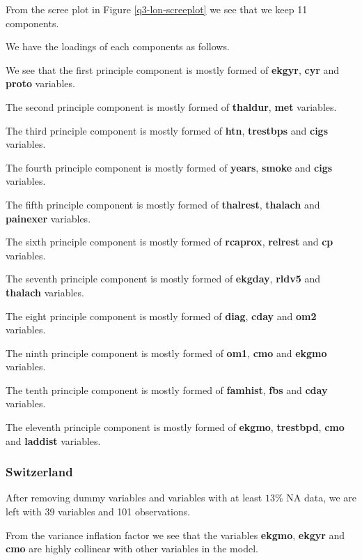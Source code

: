 \documentclass[a4paper]{article}
\begin{document}
From the scree plot in Figure \ref{q3-lon-screeplot} we see that we keep 11 components.

We have the loadings of each components as follows.



We see that the first principle component is mostly formed of \textbf{ekgyr}, \textbf{cyr} and \textbf{proto} variables.

The second principle component is mostly formed of \textbf{thaldur}, \textbf{met} variables.

The third principle component is mostly formed of \textbf{htn}, \textbf{trestbps} and \textbf{cigs} variables.

The fourth principle component is mostly formed of \textbf{years}, \textbf{smoke} and \textbf{cigs} variables.

The fifth principle component is mostly formed of \textbf{thalrest}, \textbf{thalach} and \textbf{painexer} variables.

The sixth principle component is mostly formed of \textbf{rcaprox}, \textbf{relrest} and \textbf{cp} variables.

The seventh principle component is mostly formed of \textbf{ekgday}, \textbf{rldv5} and \textbf{thalach} variables.

The eight principle component is mostly formed of \textbf{diag}, \textbf{cday} and \textbf{om2} variables.

The ninth principle component is mostly formed of \textbf{om1}, \textbf{cmo} and \textbf{ekgmo} variables.

The tenth principle component is mostly formed of \textbf{famhist}, \textbf{fbs} and \textbf{cday} variables.

The eleventh principle component is mostly formed of \textbf{ekgmo}, \textbf{trestbpd}, \textbf{cmo} and \textbf{laddist} variables.

\subsubsection{Switzerland}

After removing dummy variables and variables with at least $13\%$ NA data, we are left with 39 variables and 101 observations.



From the variance inflation factor we see that the variables \textbf{ekgmo}, \textbf{ekgyr} and \textbf{cmo} are highly collinear with other variables in the model.
\end{document}
